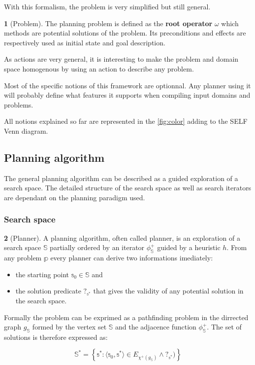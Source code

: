 \documentclass[11pt,a4paper,twoside,openright,titlepage,numbers=noenddot,headinclude,cleardoublepage=empty,openany]{scrreprt}
\theoremstyle{plain}
\theoremstyle{definition}
\newtheorem{definition}{\capitalisewords{definition}}[]
\theoremstyle{remark}
\providecommand{\tightlist}{%
  \setlength{\itemsep}{0pt}\setlength{\parskip}{0pt}}
\newcommand{\bb}{\mathbb}
\begin{document}
With this formalism, the problem is very simplified but still general.

\begin{definition}[Problem]

The planning problem is defined as the \textbf{root operator} \(\omega\)
which methods are potential solutions of the problem. Its preconditions
and effects are respectively used as initial state and goal description.

\end{definition}

As actions are very general, it is interesting to make the problem and
domain space homogenous by using an action to describe any problem.

Most of the specific notions of this framework are optionnal. Any
planner using it will probably define what features it supports when
compiling input domains and problems.

All notions explained so far are represented in the \cref{fig:color}
adding to the SELF Venn diagram.

\hypertarget{planning-algorithm}{%
\subsection{Planning algorithm}\label{planning-algorithm}}

The general planning algorithm can be described as a guided exploration
of a search space. The detailed structure of the search space as well as
search iterators are dependant on the planning paradigm used.

\hypertarget{search-space}{%
\subsubsection{Search space}\label{search-space}}

\begin{definition}[Planner]

A planning algorithm, often called planner, is an exploration of a
search space \(\bb{S}\) partially ordered by an iterator
\(\phi^+_{\bb{S}}\) guided by a heuristic \(h\). From any problem
\(\bb{p}\) every planner can derive two informations imediately:

\begin{itemize}
\tightlist
\item
  the starting point \(\bb{s}_0 \in \bb{S}\) and
\item
  the solution predicate \(?_{\bb{s}^*}\) that gives the validity of any
  potential solution in the search space.
\end{itemize}

Formally the problem can be exprimed as a pathfinding problem in the
dirrected graph \(g_{\bb{S}}\) formed by the vertex set \(\bb{S}\) and
the adjacence function \(\phi^+_{\bb{S}}\). The set of solutions is
therefore expressed as:

\[\bb{S}^* = 
\left \{ \bb{s}^* : 
  \langle \bb{s}_0, \bb{s}^* \rangle \in E_{\chi^+(g_{\bb{S}})} 
  \land ?_{\bb{s}^*})  
\right \}\]

\end{definition}
\end{document}
